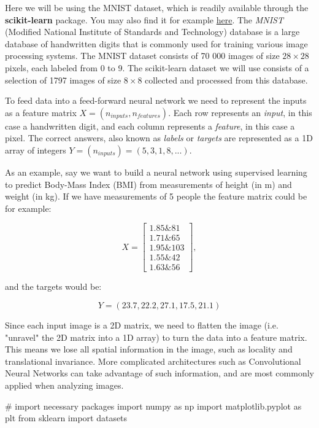 \documentclass[%
oneside,                 %
final,                   %
10pt]{article}
\begin{document}
\noindent
Here we will be using the MNIST dataset, which is readily available through the \textbf{scikit-learn}
package. You may also find it for example \href{{http://yann.lecun.com/exdb/mnist/}}{here}.  
The \emph{MNIST} (Modified National Institute of Standards and Technology) database is a large database
of handwritten digits that is commonly used for training various image processing systems.  
The MNIST dataset consists of 70 000 images of size $28\times 28$ pixels, each labeled from 0 to 9.  
The scikit-learn dataset we will use consists of a selection of 1797 images of size $8\times 8$ collected and processed from this database.  

To feed data into a feed-forward neural network we need to represent
the inputs as a feature matrix $X = (n_{inputs}, n_{features})$.  Each
row represents an \emph{input}, in this case a handwritten digit, and
each column represents a \emph{feature}, in this case a pixel.  The
correct answers, also known as \emph{labels} or \emph{targets} are
represented as a 1D array of integers 
$Y = (n_{inputs}) = (5, 3, 1, 8,...)$.

As an example, say we want to build a neural network using supervised learning to predict Body-Mass Index (BMI) from
measurements of height (in m)  
and weight (in kg). If we have measurements of 5 people the feature matrix could be for example:  

$$ X = \begin{bmatrix}
1.85 {\&} 81\\
1.71 {\&} 65\\
1.95 {\&} 103\\
1.55 {\&} 42\\
1.63 {\&} 56
\end{bmatrix} ,$$  

and the targets would be:  

$$ Y = (23.7, 22.2, 27.1, 17.5, 21.1) $$  

Since each input image is a 2D matrix, we need to flatten the image
(i.e. "unravel" the 2D matrix into a 1D array) to turn the data into a
feature matrix. This means we lose all spatial information in the
image, such as locality and translational invariance. More complicated
architectures such as Convolutional Neural Networks can take advantage
of such information, and are most commonly applied when analyzing
images.


\bpycod
# import necessary packages
import numpy as np
import matplotlib.pyplot as plt
from sklearn import datasets
\end{document}
